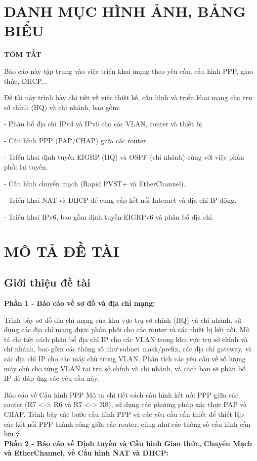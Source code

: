 \documentclass[13pt]{article}
\begin{document}
\newpage
\section*{\centering DANH MỤC HÌNH ẢNH, BẢNG BIỂU}
{}


\newpage
\begin{center}
		\textbf{TÓM TẮT}
	\end{center}

Báo cáo này tập trung vào việc triển khai mạng theo yêu cầu, cấu hình PPP, giao thức, DHCP...

Đề tài này trình bày chi tiết về việc thiết kế, cấu hình và triển khai mạng cho trụ sở chính (HQ) và chi nhánh, bao gồm:

- Phân bổ địa chỉ IPv4 và IPv6 cho các VLAN, router và thiết bị.

- Cấu hình PPP (PAP/CHAP) giữa các router.

- Triển khai định tuyến EIGRP (HQ) và OSPF (chi nhánh) cùng với việc phân phối lại tuyến.

- Cấu hình chuyển mạch (Rapid PVST+ và EtherChannel).

- Triển khai NAT và DHCP để cung cấp kết nối Internet và địa chỉ IP động.

- Triển khai IPv6, bao gồm định tuyến EIGRPv6 và phân bổ địa chỉ.


	

\newpage
        \section{MÔ TẢ ĐỀ TÀI}
        \subsection{Giới thiệu đề tài}
        \textbf{Phần 1 - Báo cáo về sơ đồ và địa chỉ mạng:}

Trình bày sơ đồ địa chỉ mạng của khu vực trụ sở chính (HQ) và chi nhánh, sử dụng các địa chỉ mạng được phân phối cho các router và các thiết
bị kết nối. Mô tả chi tiết cách phân bổ địa chỉ IP cho các VLAN
trong khu vực trụ sở chính và chi nhánh, bao gồm các thông số như
subnet mask/prefix, các địa chỉ gateway, và các địa chỉ IP cho các
máy chủ trong VLAN. Phân tích các yêu cầu về số lượng máy chủ
cho từng VLAN tại trụ sở chính và chi nhánh, và cách bạn sẽ phân
bổ IP để đáp ứng các yêu cầu này.

Báo cáo về Cấu hình PPP Mô tả chi tiết cách cấu hình kết nối PPP
giữa các router (R7 <-> R6 và R7 <-> R8), sử dụng các phương pháp
xác thực PAP và CHAP. Trình bày các bước cấu hình PPP và các
yêu cầu cần thiết để thiết lập các kết nối PPP thành công giữa các
router, cũng như các thông số cấu hình cần lưu ý
\\
		\textbf{Phần 2 - Báo cáo về Định tuyến và Cấu hình Giao thức, Chuyển Mạch và EtherChannel, về Cấu hình NAT và DHCP:}
\end{document}
